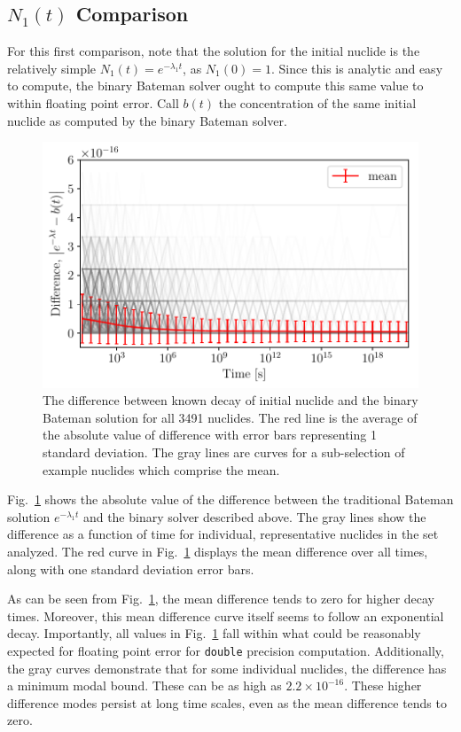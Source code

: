 \documentclass[letterpaper]{physor2018}
\begin{document}
\subsection{$N_1(t)$ Comparison}
\label{subsec-n1}
For this first comparison, note that the solution for the initial nuclide is
the relatively simple $N_1(t) = e^{-\lambda_1 t}$, as $N_1(0) = 1$. Since this is analytic and
easy to compute, the binary Bateman solver ought to compute this same
value to within floating point error.  Call $b(t)$ the concentration of the
same initial nuclide as computed by the binary Bateman solver.

\begin{figure}[!htb]
  \centering
  \includegraphics[scale=0.80]{./n1-diff.pdf}
  \caption{The difference between known decay of initial nuclide and the
           binary Bateman solution for all 3491 nuclides. The red line
           is the average of the absolute value of difference with
           error bars representing 1 standard deviation. The gray lines
           are curves for a sub-selection of example nuclides which comprise
           the mean.}
  \label{fig-n1}
\end{figure}

Fig.~\ref{fig-n1} shows the absolute value of the difference between
the traditional Bateman solution $e^{-\lambda_1 t}$ and the binary
solver described above. The gray lines show the difference as a function
of time for individual, representative nuclides in the set analyzed.
The red curve in Fig.~\ref{fig-n1} displays the mean difference over all
times, along with one standard deviation error bars.

As can be seen from Fig.~\ref{fig-n1}, the mean difference tends to zero for
higher decay times.  Moreover, this mean difference curve itself seems to
follow an exponential decay. Importantly, all values in Fig.~\ref{fig-n1}
fall within what could be reasonably expected for floating point error for
\texttt{double} precision computation. Additionally, the gray curves
demonstrate that for some individual nuclides, the difference has a minimum
modal bound. These can be as high as $2.2\times 10^{-16}$. These higher
difference modes persist at long time scales, even as the mean difference
tends to zero.
\end{document}

